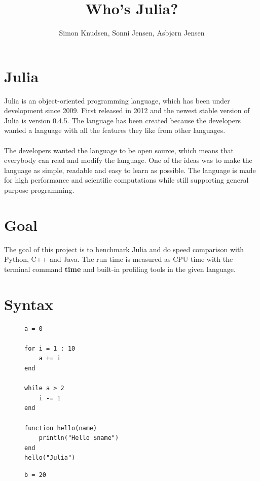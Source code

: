 \documentclass[landscape, a0]{sciposter}
\title{Who's Julia?}
\author{Simon Knudsen, Sonni Jensen, Asbjørn Jensen}
\institute{Department of Mathematics and Computer Science,\\
	University of Southern Denmark\\}
\begin{document}
\maketitle

\begin{multicols}{3}


\section{Julia}
Julia is an object-oriented programming language, which has been under development since 2009. First released in 2012 and the newest stable version of Julia is version 0.4.5. The language has been created because the developers wanted a language with all the features they like from other languages. \\
\\
The developers wanted the language to be open source, which means that everybody can read and modify the language. One of the ideas was to make the language as simple, readable and easy to learn as possible. The language is made for high performance and scientific computations while still supporting general purpose programming.
\section{Goal}
The goal of this project is to benchmark Julia and do speed comparison with Python, C++ and Java. The run time is measured as CPU time with the terminal command \textbf{time} and built-in profiling tools in the given language.
\section{Syntax}
\begin{multicols}{3}
	\begin{figure}[H]
\begin{lstlisting}[frame=none, numbers=none]
a = 0

for i = 1 : 10
	a += i
end

while a > 2
	i -= 1
end

function hello(name)
	println("Hello $name")
end 
hello("Julia") 
\end{lstlisting}
	\end{figure}
	\hfill
	\begin{figure}[H]
\begin{lstlisting}[frame=none, numbers=none]
b = 20


\end{lstlisting}
\end{figure}
\end{multicols}
\end{multicols}
\end{document}

